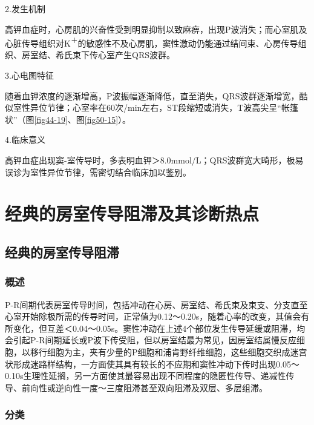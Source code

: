 2.发生机制

高钾血症时，心房肌的兴奋性受到明显抑制以致麻痹，出现P波消失；而心室肌及心脏传导组织对K\textsuperscript{＋}的敏感性不及心房肌，窦性激动仍能通过结间束、心房传导组织、房室结、希氏束下传心室产生QRS波群。

3.心电图特征

随着血钾浓度的逐渐增高，P波振幅逐渐降低，直至消失，QRS波群逐渐增宽，酷似室性异位节律；心室率在60次/min左右，ST段缩短或消失，T波高尖呈“帐篷状”（图\ref{fig44-19}、图\ref{fig50-15}）。

4.临床意义

高钾血症出现窦-室传导时，多表明血钾＞8.0mmol/L；QRS波群宽大畸形，极易误诊为室性异位节律，需密切结合临床加以鉴别。

\protect\hypertarget{text00027.html}{}{}

\protect\hypertarget{text00027.htmlux5cux23chapter27}{}{}

\chapter{经典的房室传导阻滞及其诊断热点}

\protect\hypertarget{text00027.htmlux5cux23subid323}{}{}

\section{经典的房室传导阻滞}

\protect\hypertarget{text00027.htmlux5cux23subid324}{}{}

\subsection{概述}

P-R间期代表房室传导时间，包括冲动在心房、房室结、希氏束及束支、分支直至心室开始除极所需的传导时间，正常值为0.12～0.20s，随着心率的改变，其值会有所变化，但互差＜0.04～0.05s。窦性冲动在上述4个部位发生传导延缓或阻滞，均会引起P-R间期延长或P波下传受阻，但以房室结最为常见，因房室结属慢反应细胞，以移行细胞为主，夹有少量的P细胞和浦肯野纤维细胞，这些细胞交织成迷宫状形成迷路样结构，一方面使其具有较长的不应期和窦性冲动下传时出现0.05～0.10s生理性延搁，另一方面使其最容易出现不同程度的隐匿性传导、递减性传导、前向性或逆向性一度～三度阻滞甚至双向阻滞及双层、多层组滞。

\protect\hypertarget{text00027.htmlux5cux23subid325}{}{}

\subsection{分类}

